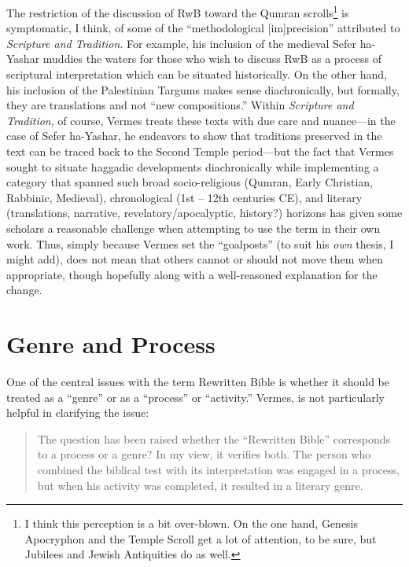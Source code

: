 The restriction of the discussion of RwB toward the Qumran
scrolls\footnote{I think this perception is a bit over-blown. On the one
  hand, Genesis Apocryphon and the Temple Scroll get a lot of attention,
  to be sure, but Jubilees and Jewish Antiquities do as well.} is
symptomatic, I think, of some of the ``methodological
{[}im{]}precision'' attributed to \emph{Scripture and Tradition}. For
example, his inclusion of the medieval Sefer ha-Yashar muddies the
waters for those who wish to discuss RwB as a process of scriptural
interpretation which can be situated historically. On the other hand,
his inclusion of the Palestinian Targums makes sense diachronically, but
formally, they are translations and not ``new compositions.'' Within
\emph{Scripture and Tradition}, of course, Vermes treats these texts
with due care and nuance---in the case of Sefer ha-Yashar, he endeavors
to show that traditions preserved in the text can be traced back to the
Second Temple period---but the fact that Vermes sought to situate
haggadic developments diachronically while implementing a category that
spanned such broad socio-religious (Qumran, Early Christian, Rabbinic,
Medieval), chronological (1st -- 12th centuries CE), and literary
(translations, narrative, revelatory/apocalyptic, history?) horizons has
given some scholars a reasonable challenge when attempting to use the
term in their own work. Thus, simply because Vermes set the
``goalposts'' (to suit his \emph{own} thesis, I might add), does not
mean that others cannot or should not move them when appropriate, though
hopefully along with a well-reasoned explanation for the change.

\section{Genre and Process}\label{genre-and-process}

One of the central issues with the term Rewritten Bible is whether it
should be treated as a ``genre'' or as a ``process'' or ``activity.''
Vermes, is not particularly helpful in clarifying the issue:

\begin{quote}
The question has been raised whether the ``Rewritten Bible'' corresponds
to a process or a genre? In my view, it verifies both. The person who
combined the biblical test with its interpretation was engaged in a
process, but when his activity was completed, it resulted in a literary
genre.\autocite[8]{vermes_zsengeller2014}
\end{quote}

